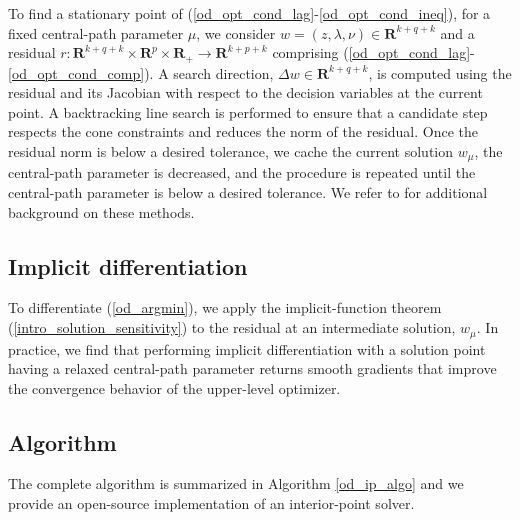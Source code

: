 To find a stationary point of (\ref{od_opt_cond_lag}-\ref{od_opt_cond_ineq}), for a fixed central-path parameter $\mu$, we consider $w = (z, \lambda, \nu) \in \mathbf{R}^{k + q + k}$ and a residual $r : \mathbf{R}^{k + q + k} \times \mathbf{R}^p \times \mathbf{R}_{+} \rightarrow \mathbf{R}^{k + p + k}$ comprising (\ref{od_opt_cond_lag}-\ref{od_opt_cond_comp}). A search direction, $\Delta w \in \mathbf{R}^{k + q + k}$, is computed using the residual and its Jacobian with respect to the decision variables at the current point. A backtracking line search is performed to ensure that a candidate step respects the cone constraints and reduces the norm of the residual. Once the residual norm is below a desired tolerance, we cache the current solution $w_{\mu}$, the central-path parameter is decreased, and the procedure is repeated until the central-path parameter is below a desired tolerance. We refer to \cite{boyd2004convex, nocedal2006numerical} for additional background on these methods.

\subsection{Implicit differentiation} 
To differentiate (\ref{od_argmin}), we apply the implicit-function theorem (\ref{intro_solution_sensitivity}) to the residual at an intermediate solution, $w_{\mu}$. In practice, we find that performing implicit differentiation with a solution point having a relaxed central-path parameter returns smooth gradients that improve the convergence behavior of the upper-level optimizer. 

\subsection{Algorithm}
The complete algorithm is summarized in Algorithm \ref{od_ip_algo} and we provide an open-source implementation of an interior-point solver.

